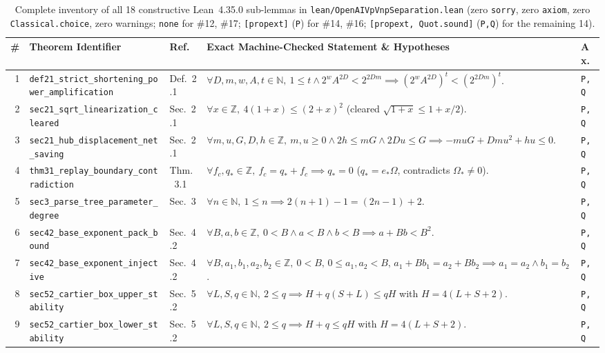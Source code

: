 \documentclass[10pt,twocolumn]{article}
\newcommand{\ZZ}{\mathbb{Z}}
\newcommand{\NN}{\mathbb{N}}
\begin{document}
\begin{table}[t]
\centering
\caption{Complete inventory of all 18 constructive Lean~4.35.0 sub-lemmas in \texttt{lean/OpenAIVpVnpSeparation.lean} (zero \texttt{sorry}, zero \texttt{axiom}, zero \texttt{Classical.choice}, zero warnings; \texttt{none} for \#12, \#17; \texttt{[propext]} (\texttt{P}) for \#14, \#16; \texttt{[propext, Quot.sound]} (\texttt{P,Q}) for the remaining 14).}
\label{tab:lean18}
\scriptsize
\setlength{\tabcolsep}{2.1pt}
\begin{tabular}{@{}r l l p{9.6cm} l@{}}
\toprule
\# & Theorem Identifier & Ref.~\cite{openai2026vpvnp} & Exact Machine-Checked Statement \& Hypotheses & Ax. \\
\midrule
1 & \texttt{def21\_strict\_shortening\_power\_amplification} & Def.~2.1 & $\forall D,m,w,A,t\in\NN,\ 1\le t \wedge 2^w A^{2D} < 2^{2Dm} \implies (2^w A^{2D})^t < (2^{2Dm})^t$. & \texttt{P,Q} \\
2 & \texttt{sec21\_sqrt\_linearization\_cleared} & Sec.~2.1 & $\forall x\in\ZZ,\ 4(1+x) \le (2+x)^2$ (cleared $\sqrt{1+x}\le 1+x/2$). & \texttt{P,Q} \\
3 & \texttt{sec21\_hub\_displacement\_net\_saving} & Sec.~2.1 & $\forall m,u,G,D,h\in\ZZ,\ m,u\ge 0 \wedge 2h\le mG \wedge 2Du\le G \implies -muG+Dmu^2+hu\le 0$. & \texttt{P,Q} \\
4 & \texttt{thm31\_replay\_boundary\_contradiction} & Thm.~3.1 & $\forall f_c, q_*\in\ZZ,\ f_c = q_* + f_c \implies q_* = 0$ ($q_* = e_*\Omega$, contradicts $\Omega_*\ne 0$). & \texttt{P,Q} \\
5 & \texttt{sec3\_parse\_tree\_parameter\_degree} & Sec.~3 & $\forall n\in\NN,\ 1\le n \implies 2(n+1)-1 = (2n-1)+2$. & \texttt{P,Q} \\
6 & \texttt{sec42\_base\_exponent\_pack\_bound} & Sec.~4.2 & $\forall B,a,b\in\ZZ,\ 0<B \wedge a<B \wedge b<B \implies a + B b < B^2$. & \texttt{P,Q} \\
7 & \texttt{sec42\_base\_exponent\_injective} & Sec.~4.2 & $\forall B,a_1,b_1,a_2,b_2\in\ZZ,\ 0<B,\,0\le a_1,a_2<B,\,a_1+Bb_1=a_2+Bb_2 \implies a_1=a_2\wedge b_1=b_2$. & \texttt{P,Q} \\
8 & \texttt{sec52\_cartier\_box\_upper\_stability} & Sec.~5.2 & $\forall L,S,q\in\NN,\ 2\le q \implies H + q(S+L) \le q H$ with $H=4(L+S+2)$. & \texttt{P,Q} \\
9 & \texttt{sec52\_cartier\_box\_lower\_stability} & Sec.~5.2 & $\forall L,S,q\in\NN,\ 2\le q \implies H + q \le q H$ with $H=4(L+S+2)$. & \texttt{P,Q} \\

\end{tabular}
\end{table}
\end{document}
